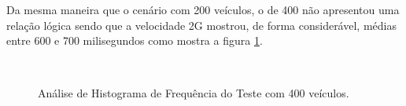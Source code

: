 \documentclass[
	12pt,				%
	oneside,			%
	a4paper,			%
	english,			%
	brazil				%
	]{abntex2ppgsi}
\begin{document}
Da mesma maneira que o cenário com 200 veículos, o de 400 não apresentou uma relação lógica sendo que a velocidade 2G mostrou, de forma considerável, médias entre 600 e 700 milisegundos  como mostra a figura \ref{fig:imgHistFreq400}.

\begin{figure}[ht]
	\caption{Análise de Histograma de Frequência do Teste  com 400 veículos.}
	\centering
	\label{fig:imgHistFreq400}
	\\
\end{figure}
\end{document}
